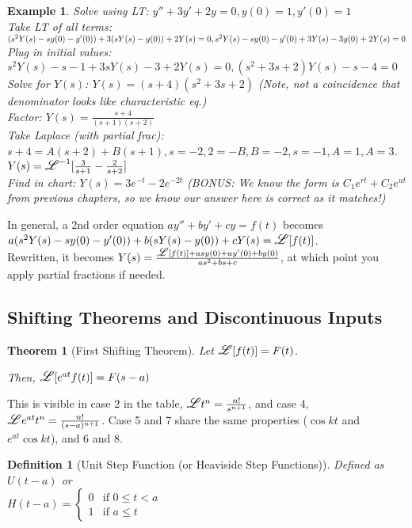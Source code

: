 \documentclass{article}
\newtheorem{definition}{Definition}
\newtheorem{theorem}{Theorem}
\newtheorem{example}{Example}
\newcommand\laplace{\mathlarger{\mathlarger{\mathscr{L}}}}
\begin{document}
\begin{example} 
	Solve using LT: $y''+3y'+2y=0, y(0)=1, y'(0)=1$\\
	Take LT of all terms: $(s^2Y(s)-sy(0)-y'(0))+3(sY(s)-y(0))+2Y(s)=0, 
	\\s^2Y(s)-sy(0)-y'(0)+3Y(s)-3y(0)+2Y(s)=0$\\
	Plug in initial values: $s^2Y(s)-s-1+3sY(s)-3+2Y(s)=0, (s^2+3s+2)Y(s)-s-4=0$\\
	Solve for $Y(s)$: $Y(s)=(s+4)(s^2+3s+2)$ (Note, not a coincidence that denominator looks like characteristic eq.)\\
	Factor: $Y(s)=\frac{s+4}{(s+1)(s+2)}$\\
	Take Laplace (with partial frac): $s+4=A(s+2)+B(s+1), s=-2, 2=-B,B=-2, s=-1, A=1, A=3$.\\
	$Y(s)=\laplace^{-1}[\frac{3}{s+1}-\frac{2}{s+2}]$\\
	Find in chart: $Y(s)=3e^{-t}-2e^{-2t}$ (BONUS: We know the form is $C_1e^{rt}+C_2e^{ut}$ from previous chapters, so we know our answer here is correct as it matches!)
\end{example}

In general, a 2nd order equation $ay''+by'+cy=f(t)$ becomes $a(s^2Y(s)-sy(0)-y'(0))+b(sY(s)-y(0))+cY(s)=\laplace[f(t)]$.\\
Rewritten, it becomes $Y(s)=\frac{\laplace[f(t)]+asy(0)+ay'(0)+by(0)}{as^2+bs+c}$, at which point you apply partial fractions if needed.

\subsection{Shifting Theorems and Discontinuous Inputs}


\begin{theorem}[First Shifting Theorem]
	Let $\laplace[f(t)]=F(t)$.

	Then, $\laplace[e^{at}f(t)]=F(s-a)$
\end{theorem}

This is visible in case 2 in the table, $\laplace{t^n}=\frac{n!}{s^{n+1}}$, and case 4, $\laplace{e^{at}t^n}=\frac{n!}{(s-a)^{n+1}}$.
Case 5 and 7 share the same properties ($\cos{kt}$ and $e^{at}\cos{kt}$), and 6 and 8.

\begin{definition} [Unit Step Function (or Heaviside Step Functions)]
	Defined as $U(t-a)$ or \\$H(t-a)=\begin{cases}
		0 & \text{if $0\leq t<a$}\\
		1 & \text{if $a \leq t$}

	\end{cases}$
\end{definition}
\end{document}
